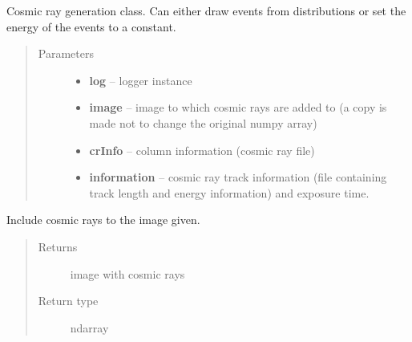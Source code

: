 \documentclass[a4paper,11pt,english]{sphinxmanual}
\begin{document}
\begin{fulllineitems}
\label{support:support.cosmicrays.cosmicrays}
Cosmic ray generation class. Can either draw events from distributions or
set the energy of the events to a constant.
\begin{quote}\begin{description}
\item[{Parameters}] \leavevmode\begin{itemize}
\item {} 
\textbf{log} -- logger instance

\item {} 
\textbf{image} -- image to which cosmic rays are added to (a copy is made not to change the original numpy array)

\item {} 
\textbf{crInfo} -- column information (cosmic ray file)

\item {} 
\textbf{information} -- cosmic ray track information (file containing track length and energy information) and
exposure time.

\end{itemize}

\end{description}\end{quote}

\begin{fulllineitems}
\label{support:support.cosmicrays.cosmicrays.addCosmicRays}
Include cosmic rays to the image given.
\begin{quote}\begin{description}
\item[{Returns}] \leavevmode
image with cosmic rays

\item[{Return type}] \leavevmode
ndarray

\end{description}\end{quote}

\end{fulllineitems}



\end{fulllineitems}
\end{document}
